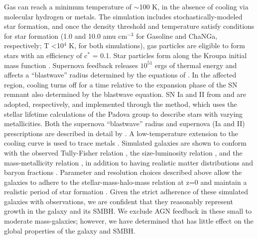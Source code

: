\documentclass[12pt,headA,chapB]{fiskthesis}
\begin{document}
Gas can reach a minimum temperature of $\sim$100 K, in the absence of cooling via molecular hydrogen or metals. The simulation includes stochastically-modeled star formation, and once the density threshold and temperature satisfy conditions for star formation (1.0 and 10.0 amu cm$^{-3}$ for Gasoline and ChaNGa, respectively; T \textless 10$^4$ K, for both simulations), gas particles are eligible to form stars with an efficiency of c$^*$ = 0.1. Star particles form along the Kroupa initial mass function \citep{Kroupa2001}. Supernova feedback releases $10^{51}$ ergs of thermal energy and affects a ``blastwave'' radius determined by the equations of \cite{Ostriker1988}. In the affected region, cooling turns off for a time relative to the expansion phase of the SN remnant also determined by the blastwave equation. SN Ia and II from \cite{Thielemann1986} and \cite{Woosley1986} are adopted, respectively, and implemented through the \cite{Raiteri1996} method, which uses the stellar lifetime calculations of the Padova group \citep{Alongi1993, Bressan1993, Bertelli1994} to describe stars with varying metallicities. Both the supernova ``blastwave'' radius and supernova (Ia and II) prescriptions are described in detail by \cite{Stinson2006}. A low-temperature extension to the cooling curve is used to trace metals \citep{Bromm2001}. Simulated galaxies are shown to conform with the observed Tully-Fisher relation \citep{Governato2009}, the size-luminosity relation \citep{Brooks2011}, and the mass-metallicity relation \citep{Brooks2007}, in addition to having realistic matter distributions and baryon fractions \citep{Governato2009a,Guedes2011}. Parameter and resolution choices described above allow the galaxies to adhere to the stellar-mass-halo-mass relation at z=0 and maintain a realistic period of star formation \citep{Moster2010,Munshi2013,Brooks2007,Maiolino2008}. Given the strict adherence of these simulated galaxies with observations, we are confident that they reasonably represent growth in the galaxy and its SMBH. We exclude AGN feedback in these small to moderate mass-galaxies; however, we have determined that has little effect on the global properties of the galaxy and SMBH.
 
\end{document}
